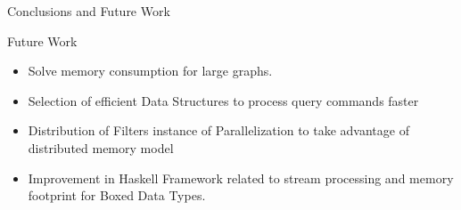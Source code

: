 \begin{frame}[fragile]{Conclusions and Future Work}
  \begin{block}{Future Work}      
    \begin{itemize}
      \item Solve memory consumption for large graphs.
      \item Selection of efficient Data Structures to process query commands faster
      \item Distribution of Filters instance of Parallelization to take advantage of distributed memory model
      \item Improvement in Haskell Framework related to stream processing and memory footprint for Boxed Data Types.
    \end{itemize}
  \end{block}
\end{frame}
